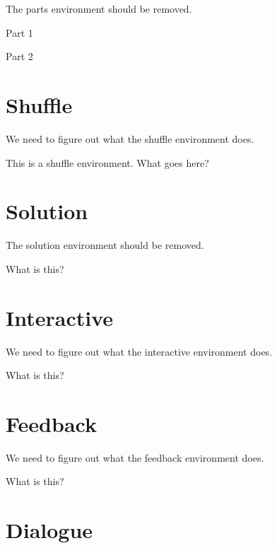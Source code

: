 \documentclass{ximera}
\begin{document}
The parts environment should be removed.

\begin{parts} %
\item Part 1
\item Part 2
\end{parts}

\section{Shuffle}

We need to figure out what the shuffle environment does.

\begin{shuffle}
This is a shuffle environment. What goes here?
\end{shuffle}



\section{Solution}

The solution environment should be removed.

\begin{solution} %
What is this?
\end{solution}

\section{Interactive}

We need to figure out what the interactive environment does.

\begin{interactive}
What is this?
\end{interactive}



\section{Feedback}

We need to figure out what the feedback environment does.

\begin{feedback}
What is this?
\end{feedback}



\section{Dialogue}
\end{document}
